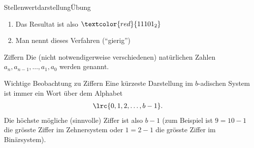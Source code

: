 \begin{frame}{Stellenwertdarstellung}{Übung}
\begin{enumerate}
{\begin{align*}
        \textcolor{red}{a_3}\cdot \underbrace{2^3}_{=8} + 
        \textcolor{red}{a_2}\cdot \underbrace{2^2}_{=4} +
        \textcolor{red}{a_1}\cdot \underbrace{2^1}_{=2} + 
        \textcolor{red}{a_0}\cdot \underbrace{2^0}_{=1}.
    \end{align*}
    }
    \item<7-> Das Resultat ist also $\textcolor{red}{11101_2}$
    \item<8-> Man nennt dieses Verfahren  (``gierig'')
    
    
\end{enumerate}
\end{frame}




\begin{frame}{Ziffern}
Die (nicht notwendigerweise verschiedenen) natürlichen Zahlen $a_n,a_{n-1},\ldots,a_1,a_0$ werden  genannt.
\end{frame}

\begin{frame}{Wichtige Beobachtung zu Ziffern}
Eine kürzeste Darstellung im $b$-adischen System ist immer ein Wort über dem Alphabet
\begin{align*}
    \lrc{0,1,2,\ldots ,b-1}.
\end{align*}
Die höchste mögliche (sinnvolle) Ziffer ist also $b-1$ (zum Beispiel ist $9 = 10-1$ die grösste Ziffer im Zehnersystem oder $1 = 2-1$ die grösste Ziffer im Binärsystem).

\centering
\end{frame}

